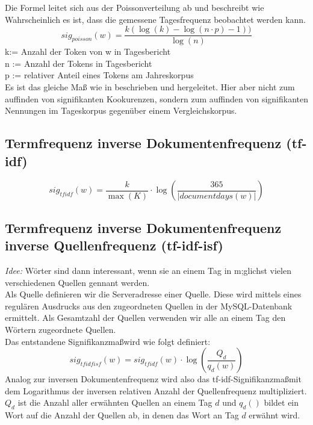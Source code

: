 Die Formel leitet sich aus der Poissonverteilung ab und beschreibt wie Wahrscheinlich es ist, dass die gemessene Tagesfrequenz beobachtet werden kann. 
\begin{equation}
sig_{poisson}(w) = \frac{k(\log(k)-\log(n\cdot p) -1 ))}{\log(n)}
\end{equation}
k:= Anzahl der Token von w in Tagesbericht\\
n := Anzahl der Tokens in Tagesbericht\\
p := relativer Anteil eines Tokens am Jahreskorpus\\
Es ist das gleiche Maß wie in \cite[S. 338-340]{heyer06} beschrieben und hergeleitet. Hier aber nicht zum auffinden von signifikanten Kookurenzen, sondern zum auffinden von signifikanten Nennungen im Tageskorpus gegenüber einem Vergleichskorpus.\\

\subsection{Termfrequenz inverse Dokumentenfrequenz (tf-idf)}
 \begin{equation}
sig_{tf idf}(w) = \frac{k}{\max(K)} \cdot \log ( \frac{365}{|documentdays(w)|})
\end{equation}

\subsection{Termfrequenz inverse Dokumentenfrequenz inverse Quellenfrequenz (tf-idf-isf)}
\emph{Idee: } W\"orter sind dann interessant, wenn sie an einem Tag in m;glichst vielen verschiedenen Quellen gennant werden.\\
Als Quelle definieren wir die Serveradresse einer Quelle. Diese wird mittels eines regul\"aren Ausdrucks aus den zugeordneten Quellen in der MySQL-Datenbank ermittelt. Als Gesamtzahl der Quellen verwenden wir alle an einem Tag den W\"ortern zugeordnete Quellen.\\
Das entstandene Signifikanzma\ss wird wie folgt definiert:
 \begin{equation}
sig_{tf idf isf}(w) = sig_{tf idf}(w) \cdot \log ( \frac{Q_d}{q_d(w)})
\end{equation}
Analog zur inversen Dokumentenfrequenz wird also das tf-idf-Signifikanzma\ss  mit dem Logarithmus der inversen relativen Anzahl der Quellenfrequenz multipliziert. $Q_d$ ist die Anzahl aller erw\"ahnten Quellen an einem Tag $d$ und $q_d()$ bildet ein Wort auf die Anzahl der Quellen ab, in denen das Wort an Tag $d$  erw\"ahnt wird. 



